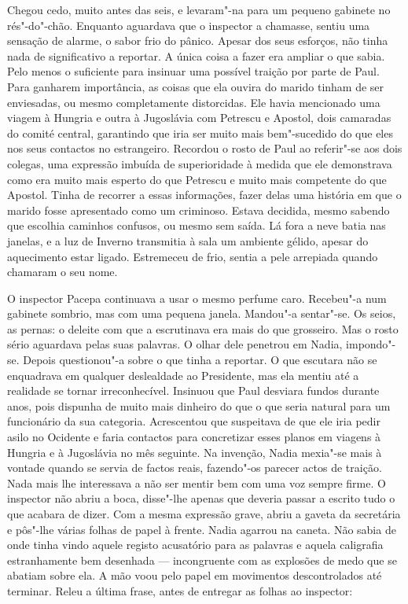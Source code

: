 Chegou cedo, muito antes das seis, e levaram"-na para um pequeno gabinete
no rés"-do"-chão. Enquanto aguardava que o inspector a chamasse, sentiu
uma sensação de alarme, o sabor frio do pânico. Apesar dos seus
esforços, não tinha nada de significativo a reportar. A única coisa a
fazer era ampliar o que sabia. Pelo menos o suficiente para insinuar uma
possível traição por parte de Paul. Para ganharem importância, as coisas
que ela ouvira do marido tinham de ser enviesadas, ou mesmo
completamente distorcidas. Ele havia mencionado uma viagem à Hungria e
outra à Jugoslávia com Petrescu e Apostol, dois camaradas do comité
central, garantindo que iria ser muito mais
bem"-sucedido do que eles nos seus contactos no estrangeiro. Recordou o
rosto de Paul ao referir"-se aos dois colegas, uma expressão imbuída de
superioridade à medida que ele demonstrava como era muito mais esperto
do que Petrescu e muito mais competente do que Apostol. Tinha de
recorrer a essas informações, fazer delas uma história em que o marido
fosse apresentado como um criminoso. Estava decidida, mesmo sabendo que
escolhia caminhos confusos, ou mesmo sem saída. Lá fora a neve batia nas
janelas, e a luz de Inverno transmitia à sala um ambiente gélido, apesar
do aquecimento estar ligado. Estremeceu de frio, sentia a pele arrepiada
quando chamaram o seu nome.

O inspector Pacepa continuava a usar o mesmo perfume caro. Recebeu"-a num gabinete sombrio, mas com uma pequena janela.
Mandou"-a sentar"-se. Os seios, as pernas: o deleite com que a escrutinava
era mais do que grosseiro. Mas o rosto sério aguardava pelas suas
palavras. O olhar dele penetrou em Nadia, impondo"-se. Depois
questionou"-a sobre o que tinha a reportar. O que escutara não se
enquadrava em qualquer deslealdade ao Presidente, mas ela mentiu até a
realidade se tornar irreconhecível. Insinuou que Paul desviara fundos
durante anos, pois dispunha de muito mais dinheiro do que o que seria
natural para um funcionário da sua categoria. Acrescentou que
suspeitava de que ele iria pedir asilo no Ocidente e faria contactos
para concretizar esses planos em viagens à Hungria e à Jugoslávia no
mês seguinte. Na invenção, Nadia mexia"-se mais à vontade quando se
servia de factos reais, fazendo"-os parecer actos de traição. Nada mais
lhe interessava a não ser mentir bem com uma voz sempre firme. O inspector não
abriu a boca, disse"-lhe apenas que deveria passar a escrito tudo o que
acabara de dizer. Com a mesma expressão grave, abriu a gaveta da
secretária e pôs"-lhe várias folhas de papel à frente. Nadia agarrou na
caneta. Não sabia de onde tinha vindo aquele registo acusatório para as
palavras e aquela caligrafia estranhamente bem desenhada ---
incongruente com as explosões de medo que se abatiam sobre ela. A mão
voou pelo papel em movimentos descontrolados até terminar. Releu a
última frase, antes de entregar as folhas ao inspector:

